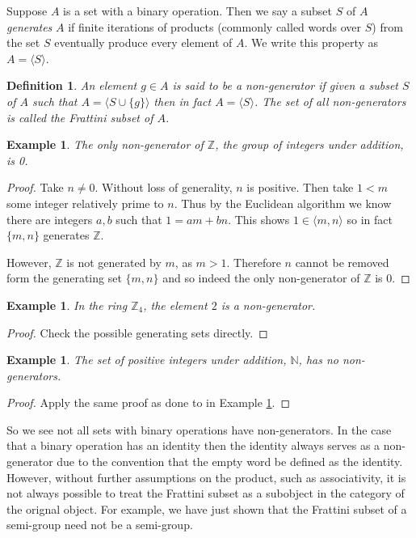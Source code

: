 \documentclass[12pt]{article}
\newtheorem{defn}[thm]{Definition}
\newtheorem{ex}[thm]{Example}
\providecommand{\union}{\cup}
\begin{document}
Suppose $A$ is a set with a binary operation.  Then we say a subset $S$ of $A$ 
\emph{generates} $A$ if finite iterations of products (commonly called words over $S$) from the set $S$ eventually produce every element of $A$.  We write
this property as $A=\langle S\rangle$.

\begin{defn}
An element $g\in A$ is said to be a \emph{non-generator} if given a subset $S$
of $A$ such that $A=\langle S\union\{g\}\rangle$ then in fact
$A=\langle S\rangle$.  The set of all non-generators is called the
\emph{Frattini subset} of $A$.
\end{defn}

\begin{ex}\label{ex:int}
The only non-generator of $\mathbb{Z}$, the group of integers under addition, 
is 0.
\end{ex}
\begin{proof}
Take $n\neq 0$.  Without loss of generality, $n$ is positive.  Then take 
$1<m$ some integer relatively prime to $n$.  Thus by the 
Euclidean algorithm we know there are integers $a,b$ such that $1=am+bn$.  
This shows $1\in \langle m,n\rangle$ so in fact $\{m,n\}$ generates 
$\mathbb{Z}$.

However, $\mathbb{Z}$ is not generated by $m$, as $m>1$.  Therefore $n$ cannot be removed form the generating set $\{m,n\}$ and so indeed the only non-generator of $\mathbb{Z}$ is $0$.
\end{proof}

\begin{ex}
In the ring $\mathbb{Z}_{4}$, the element $2$ is a non-generator.
\end{ex}
\begin{proof}
Check the possible generating sets directly.
\end{proof}

\begin{ex}
The set of positive integers under addition, $\mathbb{N}$, has no non-generators.
\end{ex}
\begin{proof} Apply the same proof as done to in Example \ref{ex:int}.
\end{proof}

So we see not all sets with binary operations have non-generators.  In the case that a binary operation has an identity then the identity always serves as a non-generator due to the convention that the empty word be defined as the identity.  However, without further assumptions on the product, such as associativity, it is not always possible to treat the Frattini subset as a subobject in the category of the orignal object.  For example, we have just shown that the Frattini subset of a semi-group need not be a semi-group.
\end{document}
